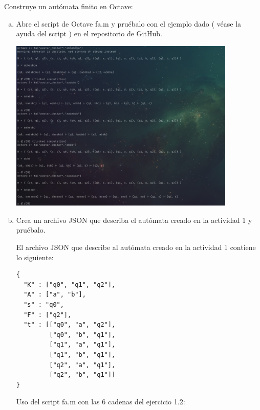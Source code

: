 Construye un autómata finito en Octave:

\begin{enumerate}[a)]
  \item Abre el script de Octave fa.m y pruébalo con el ejemplo dado ( véase la ayuda del script ) en el repositorio de GitHub.

    \includegraphics[width=0.85\textwidth]{images/octaveAutomataEjemplo.png}

  \item Crea un archivo JSON que describa el autómata creado en la actividad 1 y pruébalo.

    El archivo JSON que describe al autómata creado en la actividad 1 contiene lo siguiente:

    \begin{verbatim}
{
  "K" : ["q0", "q1", "q2"],
  "A" : ["a", "b"],
  "s" : "q0",
  "F" : ["q2"],
  "t" : [["q0", "a", "q2"],
         ["q0", "b", "q1"],
         ["q1", "a", "q1"],
         ["q1", "b", "q1"],
         ["q2", "a", "q1"],
         ["q2", "b", "q1"]]
}
    \end{verbatim}

    Uso del script fa.m con las 6 cadenas del ejercicio 1.2:



\end{enumerate}
